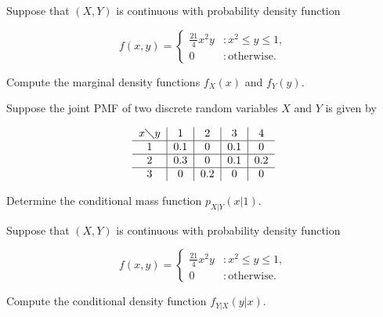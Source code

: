\documentclass[12pt,reqno]{amsart}
\begin{document}
\bigskip
\prob Suppose that $(X,Y)$ is continuous with probability density function

	\[
	f(x,y) = \begin{cases}
	\frac{21}{4}x^2 y & : x^2 \leq y \leq 1, \\
	0 & : \text{otherwise}.
	\end{cases}
	\]

Compute the marginal density functions $f_X(x)$ and $f_Y(y)$.\vfill






















\bigskip
\prob Suppose the joint PMF of two discrete random variables $X$ and $Y$ is given by

	\[
	\begin{tabular}{c|c|c|c|c}
	$x \diagdown y$ & 1 & 2 & 3 & 4 \\ \hline 
	1 & 0.1 & 0 & 0.1 & 0\\ \hline
	2 & 0.3 & 0 & 0.1 & 0.2 \\ \hline
	3 & 0 & 0.2 & 0 & 0
	\end{tabular}
	\]

Determine the conditional mass function $p_{X|Y}(x|1)$.\vfill
















\newpage
\prob Suppose that $(X,Y)$ is continuous with probability density function

	\[
	f(x,y) = \begin{cases}
	\frac{21}{4}x^2 y & : x^2 \leq y \leq 1, \\
	0 & : \text{otherwise}.
	\end{cases}
	\]

Compute the conditional density function $f_{Y|X}(y|x)$.\vfill
\end{document}

